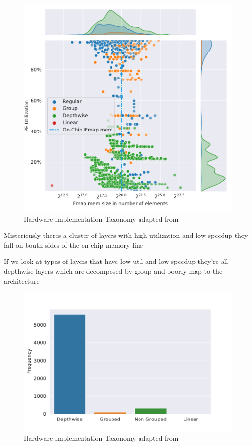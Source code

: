 \begin{figure}[ht]
    \centering
    \includegraphics[scale=0.58]{Plots/utilization/util_vs_fmap.pdf}
    \caption{Hardware Implementation Taxonomy adapted from \cite{maestro}}
    \label{fig:hw_taxonomy}
\end{figure}


Misteriously theres  a cluster of layers with high utilization and low speedup
they fall on bouth sides of the on-chip memory line

If we look at types of layers that have low util and low speedup they're all
depthwise layers which are decomposed by group and poorly map to the
architecture

\begin{figure}[ht]
    \centering
    \includegraphics[scale=0.58]{Plots/utilization/type_of_low_util.pdf}
    \caption{Hardware Implementation Taxonomy adapted from \cite{maestro}}
    \label{fig:hw_taxonomy}
\end{figure}


